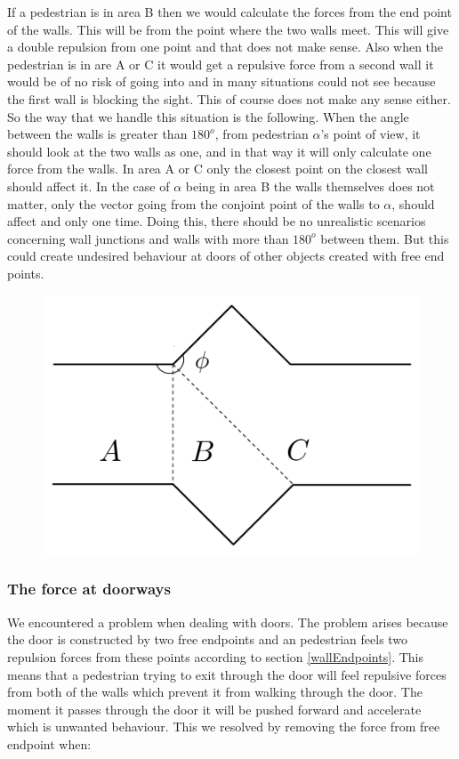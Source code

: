 If a pedestrian is in area B then we would calculate the 
forces from the end point of the walls. This will be from the point where the two 
walls meet. This will give a double repulsion from one point and that 
does not make sense. Also when the pedestrian is in are A or C it would get a repulsive force 
from a second wall it would be of no risk of going into and in many situations 
could not see because the first wall is blocking the sight. This of course does not 
make any sense either. So the way that we handle this situation is the following. 
When the angle between the walls is greater than $180^o$, from pedestrian $\alpha$'s 
point of view, it should look at the two walls as one, and in that way it will 
only calculate one force from the walls. In area A or C only the closest point 
on the closest wall should affect it. In the case of $\alpha$ being in area B 
the walls themselves does not matter, only the vector going from the conjoint 
point of the walls to $\alpha$, should affect and only one time. Doing this, 
there should be no unrealistic scenarios concerning wall junctions and walls 
with more than $180^o$ between them. But this could create undesired 
behaviour at doors of other objects created with free end points.

\begin{figure}[ht]
\centering
\includegraphics[scale=0.45]{Figures/WallCase.pdf} 
\caption{}\label{fig:wallcase}
\end{figure}

\subsubsection{The force at doorways}
We encountered a problem when dealing with doors. The problem arises because 
the door is constructed by two free endpoints and an pedestrian feels two repulsion 
forces from these points according to section \ref{wallEndpoints}. This means 
that a pedestrian trying to exit through the door will feel repulsive forces 
from both of the walls which prevent it from walking through the door. The moment it 
passes through the door it will be pushed forward and accelerate which is unwanted 
behaviour. This we resolved by removing the force from free endpoint when:

